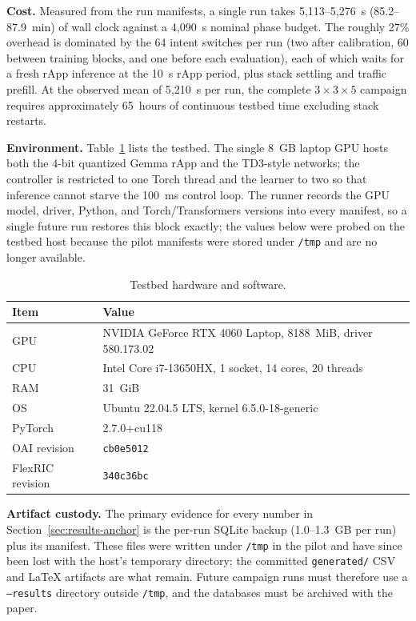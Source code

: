 \textbf{Cost.} Measured from the run manifests, a single run takes 5{,}113--5{,}276~s
(85.2--87.9~min) of wall clock against a 4{,}090~s nominal phase budget. The roughly 27\%
overhead is dominated by the 64 intent switches per run (two after calibration, 60 between
training blocks, and one before each evaluation), each of which waits for a fresh rApp
inference at the 10~s rApp period, plus stack settling and traffic prefill. At the observed
mean of 5{,}210~s per run, the complete $3\times3\times5$ campaign requires approximately
65~hours of continuous testbed time excluding stack restarts.

\textbf{Environment.} Table~\ref{tab:proto-env} lists the testbed. The single 8~GB laptop GPU
hosts both the 4-bit quantized Gemma rApp and the TD3-style networks; the controller is
restricted to one Torch thread and the learner to two so that inference cannot starve the
100~ms control loop. The runner records the GPU model, driver, Python, and Torch/Transformers
versions into every manifest, so a single future run restores this block exactly; the values
below were probed on the testbed host because the pilot manifests were stored under
\texttt{/tmp} and are no longer available.

\begin{table}[t]
\centering
\footnotesize
\caption{Testbed hardware and software.}
\label{tab:proto-env}
\begin{tabular}{ll}
\toprule
Item & Value\\
\midrule
GPU & NVIDIA GeForce RTX 4060 Laptop, 8188~MiB, driver 580.173.02\\
CPU & Intel Core i7-13650HX, 1 socket, 14 cores, 20 threads\\
RAM & 31~GiB\\
OS & Ubuntu 22.04.5 LTS, kernel 6.5.0-18-generic\\
PyTorch & 2.7.0+cu118\\
OAI revision & \texttt{cb0e5012}\\
FlexRIC revision & \texttt{340c36bc}\\
\bottomrule
\end{tabular}
\end{table}

\textbf{Artifact custody.} The primary evidence for every number in
Section~\ref{sec:results-anchor} is the per-run SQLite backup (1.0--1.3~GB per run) plus its
manifest. These files were written under \texttt{/tmp} in the pilot and have since been lost
with the host's temporary directory; the committed \texttt{generated/} CSV and \LaTeX{}
artifacts are what remain. Future campaign runs must therefore use a \texttt{--results}
directory outside \texttt{/tmp}, and the databases must be archived with the paper.
